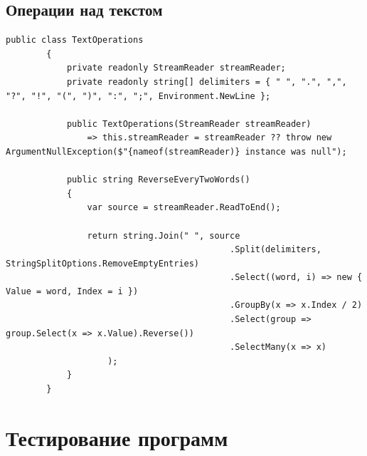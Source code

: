 \documentclass[a4paper,14pt]{extarticle}
\begin{document}
    \subsection{Операции над текстом}
    \begin{lstlisting}[language={[Sharp]C}]
        public class TextOperations
        {
            private readonly StreamReader streamReader;
            private readonly string[] delimiters = { " ", ".", ",", "?", "!", "(", ")", ":", ";", Environment.NewLine };

            public TextOperations(StreamReader streamReader)
                => this.streamReader = streamReader ?? throw new ArgumentNullException($"{nameof(streamReader)} instance was null");

            public string ReverseEveryTwoWords()
            {
                var source = streamReader.ReadToEnd();

                return string.Join(" ", source
                                            .Split(delimiters, StringSplitOptions.RemoveEmptyEntries)
                                            .Select((word, i) => new { Value = word, Index = i })
                                            .GroupBy(x => x.Index / 2)
                                            .Select(group => group.Select(x => x.Value).Reverse())
                                            .SelectMany(x => x)
                    );
            }
        }
    \end{lstlisting}

    \section{Тестирование программ}
\end{document}
